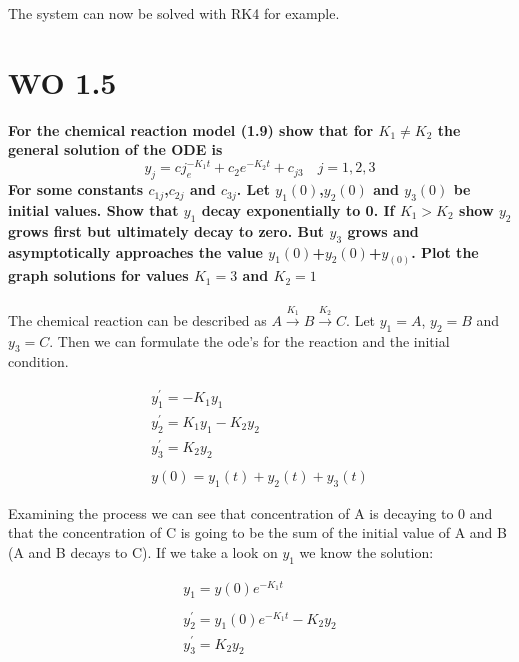 \documentclass[a4paper]{article}
\begin{document}
The system can now be solved with RK4 for example. 

\newpage

\section*{WO 1.5}
\textbf{For the chemical reaction model (1.9) show that for $K_1 \neq K_2$ the general solution of the ODE is}
\begin{equation}
y_j = cj_ e^{-K_1t} + c_2e^{-K_2t}+c_{j3} \quad j=1,2,3
\end{equation}
\textbf{For some constants $c_{1j}$,$c_{2j}$ and $c_{3j}$. Let $y_1(0)$,$y_2(0)$ and $y_3(0)$ be initial values. Show that $y_1$ decay exponentially to 0. If $K_1 > K_2$ show $y_2$ grows first but ultimately decay to zero. But $y_3$ grows and asymptotically approaches the value $y_1(0)$+$y_2(0)$+$y_(0)$. Plot the graph solutions for values $K_1 = 3$ and $K_2 = 1$}
\\
\\
The chemical reaction can be described as $A \overset{K_1}{\rightarrow} B \overset{K_2}{\rightarrow}C$. Let $y_1 = A$, $y_2 = B$ and $y_3 = C$. Then we can formulate the ode's for the reaction and the initial condition. 

\begin{equation}
\begin{aligned}
y_1^{\prime} = -K_1 y_1 \\
y_2^{\prime} = K_1 y_1 - K_2 y_2\\
y_3 ^{\prime} = K_2 y_2 \\
\\
y(0) = y_1(t) + y_2(t) + y_3(t)
\end{aligned}
\end{equation}



Examining the process we can see that concentration of A is decaying to 0 and that the concentration of C is going to be the sum of the initial value of A and B (A and B decays to C). If we take a look on $y_1$ we know the solution: 

\begin{equation}
\begin{aligned}
y_1 = y(0) e^{-K_1 t} \\
\\
y_2^{\prime} = y_1(0) e^{-K_1 t} - K_2y_2 \\
y_3^{\prime} = K_2y_2
\end{aligned}
\end{equation}
\end{document}
